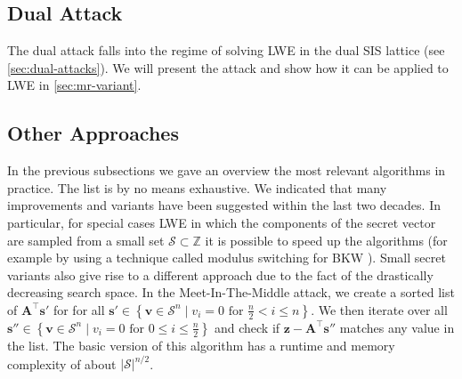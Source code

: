 








\subsection[Dual Attack]{Dual Attack \cite{MR09}} %
The dual attack \cite{MR09} falls into the regime of solving LWE in the dual SIS lattice (see \cref{sec:dual-attacks}). We will present the attack and show how it can be applied to LWE in \cref{sec:mr-variant}.



\subsection{Other Approaches}
In the previous subsections we gave an overview the most relevant algorithms in practice. The list is by no means exhaustive. We indicated that many improvements and variants have been suggested within the last two decades. In particular, for special cases LWE in which the components of the secret vector are sampled from a small set $\mathcal{S} \subset \mathbb{Z}$ it is possible to speed up the algorithms (for example by using a technique called modulus switching for BKW \cite{AFFP14}). %
Small secret variants also give rise to a different approach due to the fact of the drastically decreasing search space. In the Meet-In-The-Middle attack, we create a sorted list of $\mathbf{A}^\intercal \mathbf{s}'$ for for all $\mathbf{s}' \in \left\{ \mathbf{v} \in \mathcal{S}^n \mid v_i = 0 \text{ for } \frac{n}{2} < i \leq n\right\}$. We then iterate over all $\mathbf{s}'' \in \left\{ \mathbf{v} \in \mathcal{S}^n \mid v_i = 0 \text{ for } 0 \leq i \leq \frac{n}{2}\right\}$ and check if $\mathbf{z} - \mathbf{A}^\intercal \mathbf{s}''$ matches any value in the list. The basic version of this algorithm has a runtime and memory complexity of about $|\mathcal{S}|^{n/2}$.

